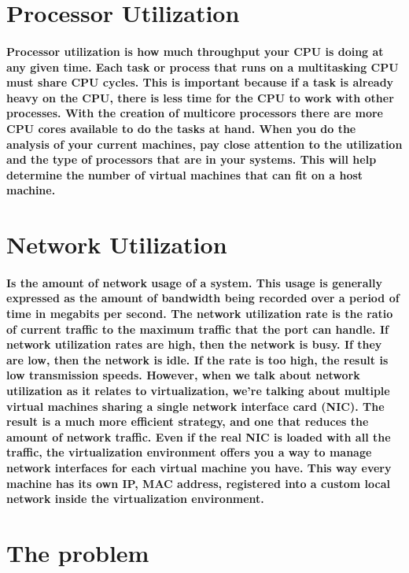\section{Processor Utilization}

\paragraph{Processor utilization is how much throughput your CPU is doing at any given time. Each
task or process that runs on a multitasking CPU must share CPU cycles. This is important because if a task is already heavy on the CPU, there is less time for the CPU to work
with other processes. With the creation of multicore processors there are more CPU cores available to do the tasks at hand. When you do the analysis of your current machines, pay
close attention to the utilization and the type of processors that are in your systems. This will help determine the number of virtual machines that can fit on a host machine.}

\section{Network Utilization}

\paragraph{Is the amount of network usage of a system. This usage is generally expressed as the amount of bandwidth being recorded over a period of time in megabits per second. 
The network utilization rate is the ratio of current traffic to the maximum traffic that the port can handle. If network utilization rates are high, then the network is busy. If they are
low, then the network is idle. If the rate is too high, the result is low transmission speeds. However, when we talk about network utilization as it relates to virtualization, 
we’re talking about multiple virtual machines sharing a single network interface card (NIC). The result is a much more efficient strategy, and one that reduces the amount of network traffic. 
Even if the real NIC is loaded with all the traffic, the virtualization environment offers you a way to manage network interfaces for each virtual machine you have. This way every machine 
has its own IP, MAC address, registered into a custom local network inside the virtualization environment.}

\section{The problem}

